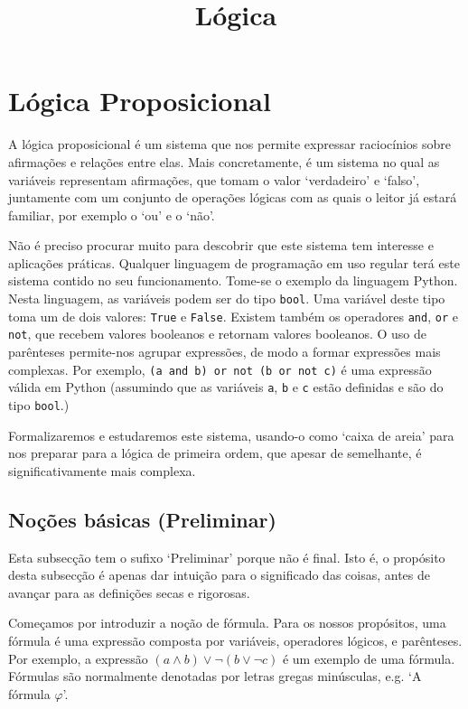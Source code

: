 \documentclass{report}
\title{Lógica}
\author{}
\date{}
\theoremstyle{definition}
\theoremstyle{remark}
\begin{document}
	\maketitle
	\newpage
	
	\tableofcontents
	\newpage
	
	\chapter{Lógica Proposicional}
	
	A lógica proposicional é um sistema que nos permite expressar raciocínios sobre afirmações e relações entre elas. Mais concretamente, é um sistema no qual as variáveis representam afirmações, que tomam o valor `verdadeiro' e `falso', juntamente com um conjunto de operações lógicas com as quais o leitor já estará familiar, por exemplo o `ou' e o `não'.
	
	Não é preciso procurar muito para descobrir que este sistema tem interesse e aplicações práticas. Qualquer linguagem de programação em uso regular terá este sistema contido no seu funcionamento. Tome-se o exemplo da linguagem Python. Nesta linguagem, as variáveis podem ser do tipo \texttt{bool}. Uma variável deste tipo toma um de dois valores: \texttt{True} e \texttt{False}. Existem também os operadores \texttt{and}, \texttt{or} e \texttt{not}, que recebem valores booleanos e retornam valores booleanos. O uso de parênteses permite-nos agrupar expressões, de modo a formar expressões mais complexas. Por exemplo, \texttt{(a and b) or not (b or not c)} é uma expressão válida em Python (assumindo que as variáveis \texttt{a}, \texttt{b} e \texttt{c} estão definidas e são do tipo \texttt{bool}.)
	
	Formalizaremos e estudaremos este sistema, usando-o como `caixa de areia' para nos preparar para a lógica de primeira ordem, que apesar de semelhante, é significativamente mais complexa.
	
	\section{Noções básicas (Preliminar)}
	
	Esta subsecção tem o sufixo `Preliminar' porque não é final. Isto é, o propósito desta subsecção é apenas dar intuição para o significado das coisas, antes de avançar para as definições secas e rigorosas.
	
	\bigskip
	
	Começamos por introduzir a noção de fórmula. Para os nossos propósitos, uma fórmula é uma expressão composta por variáveis, operadores lógicos, e parênteses. Por exemplo, a expressão $(a \land b) \lor \neg (b \lor \neg c)$ é um exemplo de uma fórmula. Fórmulas são normalmente denotadas por letras gregas minúsculas, e.g. `A fórmula $\varphi$'.
	
\end{document}
